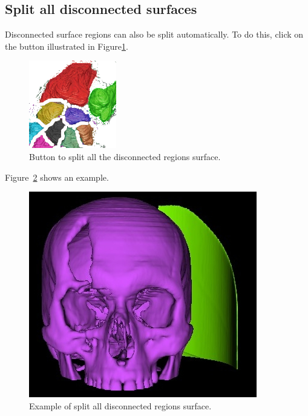 \subsection{Split all disconnected surfaces}

Disconnected surface regions can also be split automatically. To do this, click on the button illustrated in Figure\ref{fig:connectivity_split_all}.

\begin{figure}[!htb]
\centering
\includegraphics[scale=0.2]{../user_guide_figures/icons/connectivity_split_all.png}
\caption{Button to split all the disconnected regions surface.}
\label{fig:connectivity_split_all}
\end{figure}

Figure~\ref{fig:extrac_most_region_4} shows an example.

\begin{figure}[!htb]
\centering
\includegraphics[scale=0.3]{../user_guide_figures/invesalius_screen/surface_extract_most_region_4.jpg}
\caption{Example of split all disconnected regions surface.}
\label{fig:extrac_most_region_4}
\end{figure}

